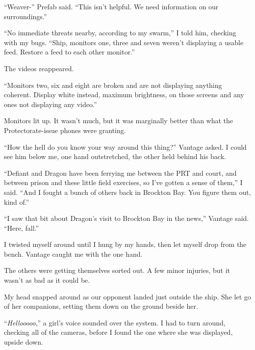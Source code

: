 ``Weaver-'' Prefab said.  ``This isn't helpful.  We need information on our surroundings.''



``No immediate threats nearby, according to my swarm,'' I told him, checking with my bugs.  ``Ship, monitors one, three and seven weren't displaying a usable feed.  Restore a feed to each other monitor.''



The videos reappeared.



``Monitors two, six and eight are broken and are not displaying anything coherent.  Display white instead, maximum brightness, on those screens and any ones not displaying any video.''



Monitors lit up.  It wasn't much, but it was marginally better than what the Protectorate-issue phones were granting.



``How the hell do you know your way around this thing?''  Vantage asked.  I could see him below me, one hand outstretched, the other held behind his back.



``Defiant and Dragon have been ferrying me between the PRT and court, and between prison and these little field exercises, so I've gotten a sense of them,'' I said.  ``And I fought a bunch of others back in Brockton Bay.  You figure them out, kind of.''



``I saw that bit about Dragon's visit to Brockton Bay in the news,'' Vantage said.  ``Here, fall.''



I twisted myself around until I hung by my hands, then let myself drop from the bench.  Vantage caught me with the one hand.



The others were getting themselves sorted out.  A few minor injuries, but it wasn't as bad as it could be.



My head snapped around as our opponent landed just outside the ship.  She let go of her companions, setting them down on the ground beside her.



``\emph{Hellooooo},'' a girl's voice sounded over the system.  I had to turn around, checking all of the cameras, before I found the one where she was displayed, upside down.



